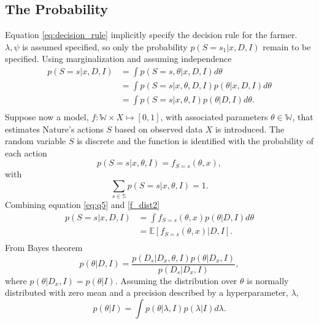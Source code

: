 \documentclass[a4paper,11pt, oneside]{article}
\theoremstyle{definition}
\begin{document}
	\subsection{The Probability}
	\label{section:sex}
	Equation \eqref{eq:decision_rule} implicitly specify the decision rule for the farmer. $\lambda,\psi$ is assumed specified, so only the probability $p(S= s_1|x,D,I)$ remain to be specified. Using marginalization and assuming independence 
	\begin{equation}
		\begin{split}
			p(S= s|x,D,I) &= \int p(S= s,\theta|x,D,I) d\theta \\
			& = \int p(S= s|x,\theta,D,I)  p(\theta|x,D,I)d\theta \\
			& = \int p(S= s|x,\theta,I)  p(\theta|D,I)d\theta. \\
		\end{split}
		\label{eq:q5}
	\end{equation}
	Suppose now a model, $f: \mathbb{W}\times X\mapsto[0,1]$, with associated parameters $\theta\in \mathbb{W}$, that estimates Nature's actions $S$ based on observed data $X$ is introduced. The random variable $S$ is discrete and the function is identified with the probability of each action
	\begin{equation}
		p(S = s|x,\theta,I)= f_{S = s}(\theta,x),
		\label{f_dist2}
	\end{equation}
	with
	\begin{equation}
		\sum_{s\in\mathbb{S}} p(S = s|x,\theta,I) = 1.
	\end{equation}
	Combining equation \eqref{eq:q5} and \eqref{f_dist2}
	\begin{equation}
		\begin{split}
			p(S= s|x,D,I) & = \int f_{S = s}(\theta,x)  p(\theta|D,I)d\theta \\
			& = \mathbb{E}[f_{S = s}(\theta,x)|D,I].\\
		\end{split}
	\end{equation}
	From Bayes theorem
	\begin{equation}
		p(\theta|D,I) =\frac{p(D_s|D_x,\theta,I)p(\theta|D_x,I)}{p(D_s|D_x,I)},
	\end{equation}
	where $p(\theta|D_x,I) = p(\theta|I)$. Assuming the distribution over $\theta$ is normally distributed with zero mean and a precision described by a hyperparameter, $\lambda$, 
	\begin{equation}
		p(\theta|I) = \int p(\theta|\lambda,I)p(\lambda|I)d\lambda.
		\label{eq:lambda}
	\end{equation}
\end{document}
